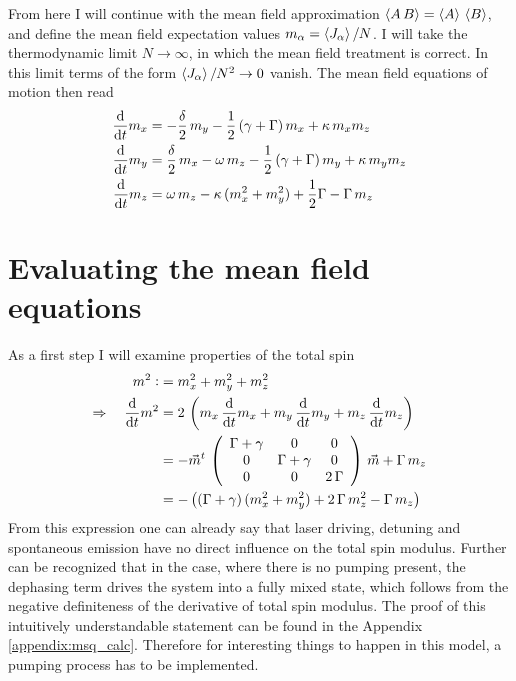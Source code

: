 \documentclass{article}
\begin{document}
From here I will continue with the mean field approximation $\braket{A\,B}=\braket{A}\,\braket{B}$, and define the mean field expectation values $m_\alpha=\braket{J_\alpha}/N$. I will take the thermodynamic limit $N\rightarrow\infty$, in which the mean field treatment is correct. In this limit terms of the form $\braket{J_\alpha}/N^2\rightarrow0$ vanish. The mean field equations of motion then read
\begin{align*}
    \frac{\text{d}}{\text{d}t} m_x &= -\frac{\delta}{2}\,m_y-\frac{1}{2}\,(\gamma+\Gamma)\,m_x+\kappa\,m_x m_z\\
    \frac{\text{d}}{\text{d}t} m_y &= \frac{\delta}{2}\,m_x-\omega\,m_z-\frac{1}{2}\,(\gamma+\Gamma)\,m_y+\kappa\,m_y m_z\\
    \frac{\text{d}}{\text{d}t} m_z &= \omega\,m_z - \kappa\,(m_x^2+m_y^2)+\frac{1}{2}\Gamma-\Gamma\,m_z
\end{align*}
\section{Evaluating the mean field equations}
As a first step I will examine properties of the total spin
\begin{align*}
    m^2\vcentcolon&=m_x^2+m_y^2+m_z^2\\
    \Rightarrow\quad\frac{\text{d}}{\text{d}t} m^2&=2\,\left( m_x\,\frac{\text{d}}{\text{d}t} m_x +m_y\,\frac{\text{d}}{\text{d}t} m_y +m_z\,\frac{\text{d}}{\text{d}t} m_z \right)\\
    &=-\vec{m}^t\,\left( \begin{array}{ccc}
        \Gamma+\gamma & 0&0  \\
        0& \Gamma+\gamma & 0\\
        0&0&2\,\Gamma
   \end{array}\right)\,\vec{m}+\Gamma\,m_z\\
   &=-\left(  (\Gamma+\gamma)\,(m_x^2+m_y^2)+2\,\Gamma\,m_z^2-\Gamma\,m_z \right)
\end{align*}
From this expression one can already say that laser driving, detuning and spontaneous emission have no direct influence on the total spin modulus. Further can be recognized that in the case, where there is no pumping present, the dephasing term drives the system into a fully mixed state, which follows from the negative definiteness of the derivative of total spin modulus. The proof of this intuitively understandable statement can be found in the Appendix \ref{appendix:msq_calc}. Therefore for interesting things to happen in this model, a pumping process has to be implemented.
\end{document}
